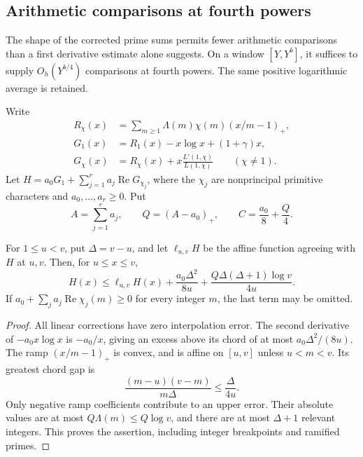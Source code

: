 \subsection{Arithmetic comparisons at fourth powers}\label{shared-fourth-powers}

The shape of the corrected prime sums permits fewer arithmetic
comparisons than a first derivative estimate alone suggests. On a
window $[Y,Y^b]$, it suffices to supply $O_h(Y^{b/4})$ comparisons
at fourth powers. The same positive logarithmic average is retained.

Write
\[
 \begin{aligned}
 R_\chi(x)&=\sum_{m\ge1}\Lambda(m)\chi(m)(x/m-1)_+,\\
 G_1(x)&=R_1(x)-x\log x+(1+\gamma)x,\\
 G_\chi(x)&=R_\chi(x)+x\frac{L'(1,\chi)}{L(1,\chi)}
 \qquad(\chi\ne1).
 \end{aligned}
\]
Let $H=a_0G_1+\sum_{j=1}^r a_j\operatorname{Re}G_{\chi_j}$,
where the $\chi_j$ are nonprincipal primitive characters and
$a_0,\ldots,a_r\ge0$.
Put
\begin{equation}\label{shared-fourth-constants}
 A=\sum_{j=1}^r a_j,\qquad Q=(A-a_0)_+,
 \qquad C=\frac{a_0}{8}+\frac Q4.
\end{equation}

\begin{lemma}\label{shared-fourth-chord}
For $1\le u<v$, put $\Delta=v-u$, and let $\ell_{u,v}H$ be the
affine function agreeing with $H$ at $u,v$. Then, for $u\le x\le v$,
\begin{equation}\label{shared-fourth-chord-bound}
 H(x)\le\ell_{u,v}H(x)+\frac{a_0\Delta^2}{8u}
       +\frac{Q\Delta(\Delta+1)\log v}{4u}.
\end{equation}
If $a_0+\sum_j a_j\operatorname{Re}\chi_j(m)\ge0$ for every
integer $m$, the last term may be omitted.
\end{lemma}
\begin{proof}
All linear corrections have zero interpolation error. The second
derivative of $-a_0x\log x$ is $-a_0/x$, giving an excess above its
chord of at most $a_0\Delta^2/(8u)$. The ramp $(x/m-1)_+$ is
convex, and is affine on $[u,v]$ unless $u<m<v$. Its greatest
chord gap is
\[
 \frac{(m-u)(v-m)}{m\Delta}\le\frac\Delta{4u}.
\]
Only negative ramp coefficients contribute to an upper error. Their
absolute values are at most $Q\Lambda(m)\le Q\log v$, and there
are at most $\Delta+1$ relevant integers. This proves the assertion,
including integer breakpoints and ramified primes.
\end{proof}


